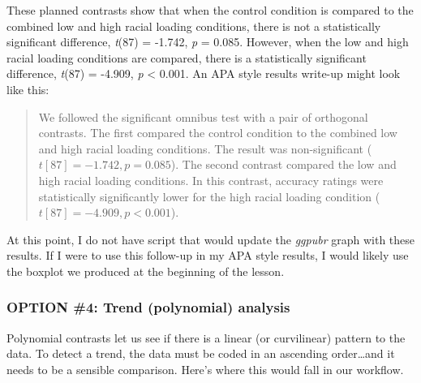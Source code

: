 \documentclass[
  11pt,
]{book}
\begin{document}
These planned contrasts show that when the control condition is compared to the combined low and high racial loading conditions, there is not a statistically significant difference, \emph{t}(87) = -1.742, \emph{p} = 0.085. However, when the low and high racial loading conditions are compared, there is a statistically significant difference, \emph{t}(87) = -4.909, \emph{p} \textless{} 0.001. An APA style results write-up might look like this:

\begin{quote}
We followed the significant omnibus test with a pair of orthogonal contrasts. The first compared the control condition to the combined low and high racial loading conditions. The result was non-significant (\(t[87] = -1.742, p = 0.085\)). The second contrast compared the low and high racial loading conditions. In this contrast, accuracy ratings were statistically significantly lower for the high racial loading condition (\(t[87] = -4.909, p < 0.001\)).
\end{quote}

At this point, I do not have script that would update the \emph{ggpubr} graph with these results. If I were to use this follow-up in my APA style results, I would likely use the boxplot we produced at the beginning of the lesson.

\hypertarget{option-4-trend-polynomial-analysis}{%
\subsubsection{OPTION \#4: Trend (polynomial) analysis}\label{option-4-trend-polynomial-analysis}}

Polynomial contrasts let us see if there is a linear (or curvilinear) pattern to the data. To detect a trend, the data must be coded in an ascending order\ldots and it needs to be a sensible comparison. Here's where this would fall in our workflow.
\end{document}
